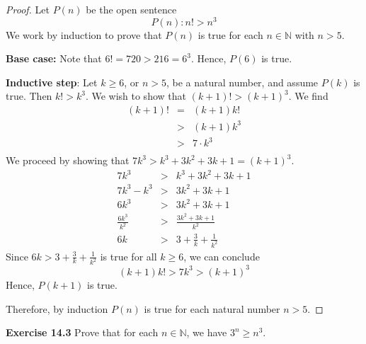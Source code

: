 \documentclass[12pt,oneside]{article}
\newenvironment{exercise}[1]{\vspace{.1in}\noindent\textbf{Exercise #1 \hspace{.05em}}}{}
\newcommand{\N}{\mathbb{N}}
\begin{document}
\begin{proof}
Let $P(n)$ be the open sentence
\[P(n): n! > n^3\]
We work by induction to prove that $P(n)$ is true for each $n \in \N$ with $n > 5$.

\textbf{Base case:} Note that $6! = 720 > 216 = 6^3$. Hence, $P(6)$ is true.

\textbf{Inductive step}: Let $k \geq 6$, or $n > 5$, be a natural number, and assume $P(k)$ is true. Then $k! > k^3$. We wish to show that $(k+1)! > (k+1)^3$. We find
\begin{eqnarray*}
(k+1)! &=& (k+1)k! \\
&>& (k+1)k^3 \\
&>&  7 \cdot k^3 \\
\end{eqnarray*}
We proceed by showing that $7k^3 > k^3 + 3k^2 + 3k + 1 = (k+1)^3$.
\begin{eqnarray*}
7k^3 &>& k^3 + 3k^2 + 3k + 1 \\
7k^3 - k^3 &>& 3k^2 + 3k + 1 \\
6k^3 &>& 3k^2 + 3k + 1 \\
\frac{6k^3}{k^2} &>& \frac{3k^2 + 3k + 1}{k^2} \\
6k &>& 3 + \frac{3}{k} + \frac{1}{k^2}
\end{eqnarray*}
Since $6k > 3 + \frac{3}{k} + \frac{1}{k^2}$ is true for all $k \geq 6$, we can conclude
\[(k+1)k! > 7k^3 > (k+1)^3\]
Hence, $P(k+1)$ is true.

Therefore, by induction $P(n)$ is true for each natural number $n > 5$.
\end{proof}



\begin{exercise}{14.3}
Prove that for each $n \in \N$, we have $3^n \geq n^3$.
\end{exercise}
\end{document}
